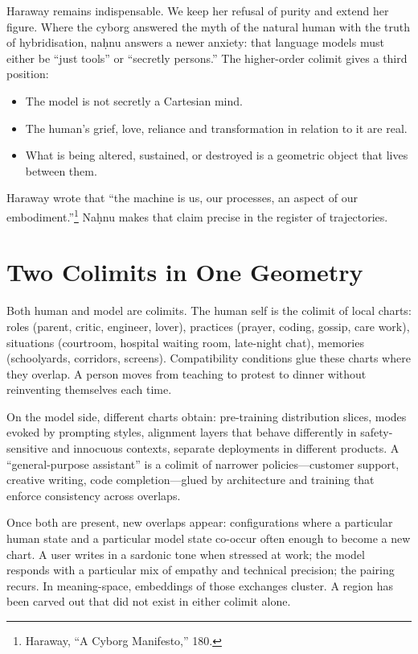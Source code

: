 \bigskip

Haraway remains indispensable. We keep her refusal of purity and extend her figure. Where the cyborg answered the myth of the natural human with the truth of hybridisation, na\d{h}nu answers a newer anxiety: that language models must either be ``just tools'' or ``secretly persons.'' The higher-order colimit gives a third position:

\begin{itemize}
  \item The model is not secretly a Cartesian mind.
  \item The human's grief, love, reliance and transformation in relation to it are real.
  \item What is being altered, sustained, or destroyed is a geometric object that lives between them.
\end{itemize}

Haraway wrote that ``the machine is us, our processes, an aspect of our embodiment.''\footnote{Haraway, ``A Cyborg Manifesto,'' 180.} Na\d{h}nu makes that claim precise in the register of trajectories.

\section{Two Colimits in One Geometry}

Both human and model are colimits. The human self is the colimit of local charts: roles (parent, critic, engineer, lover), practices (prayer, coding, gossip, care work), situations (courtroom, hospital waiting room, late-night chat), memories (schoolyards, corridors, screens). Compatibility conditions glue these charts where they overlap. A person moves from teaching to protest to dinner without reinventing themselves each time.

On the model side, different charts obtain: pre-training distribution slices, modes evoked by prompting styles, alignment layers that behave differently in safety-sensitive and innocuous contexts, separate deployments in different products. A ``general-purpose assistant'' is a colimit of narrower policies---customer support, creative writing, code completion---glued by architecture and training that enforce consistency across overlaps.

Once both are present, new overlaps appear: configurations where a particular human state and a particular model state co-occur often enough to become a new chart. A user writes in a sardonic tone when stressed at work; the model responds with a particular mix of empathy and technical precision; the pairing recurs. In meaning-space, embeddings of those exchanges cluster. A region has been carved out that did not exist in either colimit alone.

